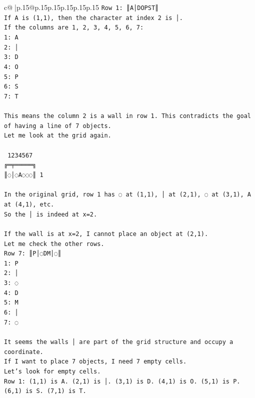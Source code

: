 \documentclass{article}
\begin{document}
{\begin{supertabular}{c@{$\;$}|p{.15\linewidth}@{}p{.15\linewidth}p{.15\linewidth}p{.15\linewidth}p{.15\linewidth}p{.15\linewidth}}
{{{\texttt{Row 1: ║A│DOPST║} \\
\texttt{If A is (1,1), then the character at index 2 is │.} \\
\texttt{If the columns are 1, 2, 3, 4, 5, 6, 7:} \\
\texttt{1: A} \\
\texttt{2: │} \\
\texttt{3: D} \\
\texttt{4: O} \\
\texttt{5: P} \\
\texttt{6: S} \\
\texttt{7: T} \\
\\ 
\texttt{This means the column 2 is a wall in row 1. This contradicts the goal of having a line of 7 objects.} \\
\texttt{Let me look at the grid again.} \\
\\ 
\texttt{ 1234567} \\
\texttt{╔═╤═════╗} \\
\texttt{║◌│◌A◌◌◌║ 1} \\
\\ 
\texttt{In the original grid, row 1 has ◌ at (1,1), │ at (2,1), ◌ at (3,1), A at (4,1), etc.} \\
\texttt{So the │ is indeed at x=2.} \\
\\ 
\texttt{If the wall is at x=2, I cannot place an object at (2,1).} \\
\texttt{Let me check the other rows.} \\
\texttt{Row 7: ║P│◌DM│◌║} \\
\texttt{1: P} \\
\texttt{2: │} \\
\texttt{3: ◌} \\
\texttt{4: D} \\
\texttt{5: M} \\
\texttt{6: │} \\
\texttt{7: ◌} \\
\\ 
\texttt{It seems the walls │ are part of the grid structure and occupy a coordinate.} \\
\texttt{If I want to place 7 objects, I need 7 empty cells.} \\
\texttt{Let's look for empty cells.} \\
\texttt{Row 1: (1,1) is A. (2,1) is │. (3,1) is D. (4,1) is O. (5,1) is P. (6,1) is S. (7,1) is T.} \\
}}}
\end{supertabular}}
\end{document}
